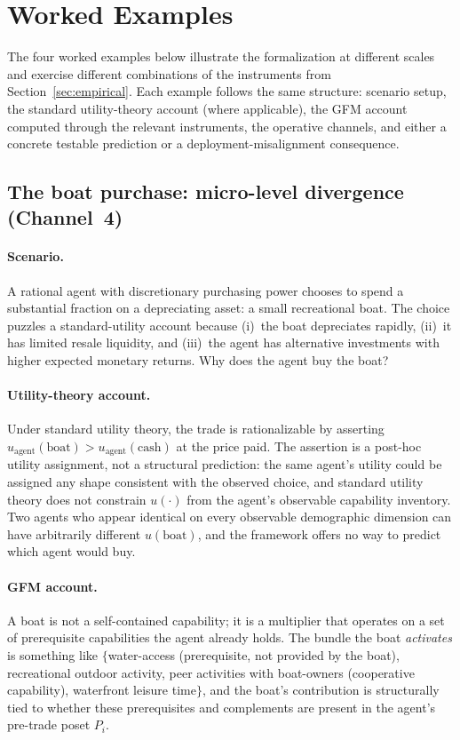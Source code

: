 \section{Worked Examples}
\label{sec:worked_examples}

The four worked examples below illustrate the formalization at
different scales and exercise different combinations of the
instruments from Section~\ref{sec:empirical}.  Each example follows
the same structure: scenario setup, the standard utility-theory
account (where applicable), the GFM account computed through the
relevant instruments, the operative channels, and either a concrete
testable prediction or a deployment-misalignment consequence.

\subsection{The boat purchase: micro-level divergence (Channel~4)}
\label{sec:wex_boat}

\paragraph{Scenario.}
A rational agent with discretionary purchasing power chooses to
spend a substantial fraction on a depreciating asset: a small
recreational boat.  The choice puzzles a standard-utility
account because (i)~the boat depreciates rapidly, (ii)~it has
limited resale liquidity, and (iii)~the agent has alternative
investments with higher expected monetary returns.  Why does the
agent buy the boat?

\paragraph{Utility-theory account.}
Under standard utility theory, the trade is rationalizable by
asserting $u_{\mathrm{agent}}(\mathrm{boat}) > u_{\mathrm{agent}}(\mathrm{cash})$
at the price paid.  The assertion is a post-hoc utility
assignment, not a structural prediction: the same agent's
utility could be assigned any shape consistent with the
observed choice, and standard utility theory does not
constrain $u(\cdot)$ from the agent's observable capability
inventory.  Two agents who appear identical on every
observable demographic dimension can have arbitrarily different
$u(\mathrm{boat})$, and the framework offers no way to predict
which agent would buy.

\paragraph{GFM account.}
A boat is not a self-contained capability; it is a multiplier
that operates on a set of prerequisite capabilities the agent
already holds.  The bundle the boat \emph{activates} is
something like $\{$water-access (prerequisite, not provided
by the boat), recreational outdoor activity, peer activities
with boat-owners (cooperative capability), waterfront leisure
time$\}$, and the boat's contribution is structurally tied to
whether these prerequisites and complements are present in the
agent's pre-trade poset $P_i$.

